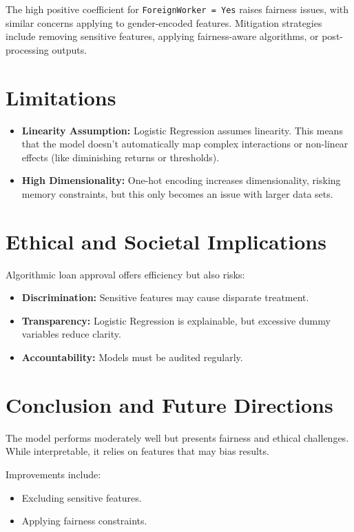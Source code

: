 \documentclass[12pt]{article}
\begin{document}
	The high positive coefficient for \texttt{ForeignWorker = Yes} raises fairness issues, with similar concerns applying to gender-encoded features. Mitigation strategies include removing sensitive features, applying fairness-aware algorithms, or post-processing outputs.
	
	\section{Limitations}
	\begin{itemize}
		\item \textbf{Linearity Assumption:} Logistic Regression assumes linearity. This means that the model doesn't automatically map complex interactions or non-linear effects (like diminishing returns or thresholds).
		\item \textbf{High Dimensionality:} One-hot encoding increases dimensionality, risking memory constraints, but this only becomes an issue with larger data sets.
	\end{itemize}
	
	\section{Ethical and Societal Implications}
	Algorithmic loan approval offers efficiency but also risks:
	\begin{itemize}
		\item \textbf{Discrimination:} Sensitive features may cause disparate treatment.
		\item \textbf{Transparency:} Logistic Regression is explainable, but excessive dummy variables reduce clarity.
		\item \textbf{Accountability:} Models must be audited regularly.
	\end{itemize}
	
	\section{Conclusion and Future Directions}
	The model performs moderately well but presents fairness and ethical challenges. While interpretable, it relies on features that may bias results. 
	
	Improvements include:
	\begin{itemize}
		\item Excluding sensitive features.
		\item Applying fairness constraints.
	\end{itemize}
	
\end{document}
